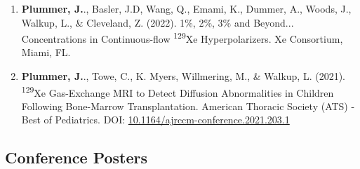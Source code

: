 \documentclass[12pt,]{scrartcl}
\begin{document}
\begin{enumerate}
  \item \textbf{Plummer, J.}., Basler, J.D, Wang, Q., Emami, K., Dummer, A., Woods, J., Walkup, L., \& Cleveland, Z. (2022). 1\%, 2\%, 3\% and Beyond... Concentrations in Continuous-flow \textsuperscript{129}Xe Hyperpolarizers. Xe Consortium, Miami, FL.
  
  \item \textbf{Plummer, J.}., Towe, C., K. Myers, Willmering, M., \& Walkup, L. (2021). \textsuperscript{129}Xe Gas-Exchange MRI to Detect Diffusion Abnormalities in Children Following Bone-Marrow Transplantation. American Thoracic Society (ATS) - Best of Pediatrics. DOI: \href{http://dx.doi.org/10.1164/ajrccm-conference.2021.203.1_MeetingAbstracts.A1166}{10.1164/ajrccm-conference.2021.203.1}
  
  
\end{enumerate}



\subsection{Conference Posters}\label{conferences}
\end{document}

